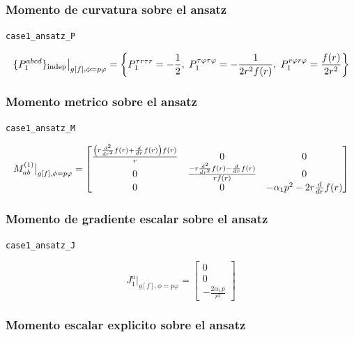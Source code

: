 \documentclass[11pt,a4paper]{article}
\begin{document}
\subsubsection{Momento de curvatura sobre el ansatz}

\noindent\texttt{case1\_ansatz\_P}\par\nopagebreak[4]

\[
\resizebox{\textwidth}{!}{$\displaystyle \{P_1^{abcd}\}_{\mathrm{indep}}\big|_{g[f],\phi=p\varphi} = \left\{P_1^{{\tau}{r}{\tau}{r}}=- \frac{1}{2},\;P_1^{{\tau}{\varphi}{\tau}{\varphi}}=- \frac{1}{2 r^{2} f{\left(r \right)}},\;P_1^{{r}{\varphi}{r}{\varphi}}=\frac{f{\left(r \right)}}{2 r^{2}}\right\}$}
\]

\subsubsection{Momento metrico sobre el ansatz}

\noindent\texttt{case1\_ansatz\_M}\par\nopagebreak[4]

\[
\resizebox{\textwidth}{!}{$\displaystyle M^{(1)}_{ab}\big|_{g[f],\phi=p\varphi} = \left[\begin{matrix}\frac{\left(r \frac{d^{2}}{d r^{2}} f{\left(r \right)} + \frac{d}{d r} f{\left(r \right)}\right) f{\left(r \right)}}{r} & 0 & 0\\0 & \frac{- r \frac{d^{2}}{d r^{2}} f{\left(r \right)} - \frac{d}{d r} f{\left(r \right)}}{r f{\left(r \right)}} & 0\\0 & 0 & - \alpha_{1} p^{2} - 2 r \frac{d}{d r} f{\left(r \right)}\end{matrix}\right]$}
\]

\subsubsection{Momento de gradiente escalar sobre el ansatz}

\noindent\texttt{case1\_ansatz\_J}\par\nopagebreak[4]

\[
J_1^a\big|_{g[f],\phi=p\varphi} = \left[\begin{matrix}0\\0\\- \frac{2 \alpha_{1} p}{r^{2}}\end{matrix}\right]
\]

\subsubsection{Momento escalar explicito sobre el ansatz}
\end{document}
